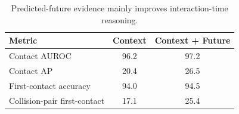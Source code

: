 \begin{table}[t]
\centering
\caption{Predicted-future evidence mainly improves interaction-time reasoning.}
\label{tab:clevrer-future-events}
\small
\renewcommand{\arraystretch}{1.05}
\begin{tabularx}{0.70\linewidth}{@{}Lcc@{}}
\toprule\toprule
\textbf{Metric} & \textbf{Context} & \textbf{Context + Future} \\
\midrule
Contact AUROC & 96.2 & 97.2 \\
Contact AP & 20.4 & 26.5 \\
First-contact accuracy & 94.0 & 94.5 \\
Collision-pair first-contact & 17.1 & 25.4 \\
\bottomrule\bottomrule
\end{tabularx}
\end{table}
